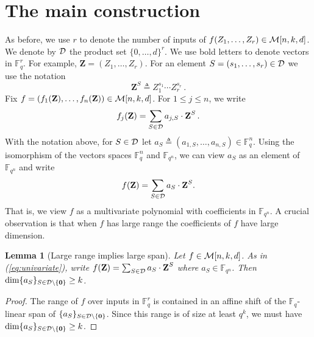\documentclass[10pt]{article}
\newtheorem{lemma}[theorem]{Lemma}
\theoremstyle{definition}
\numberwithin{equation}{section}
\newcommand{\F}{\mathbb F_q}
\newcommand{\Fn}{\mathbb F_{q^n}}
\newcommand{\M}[3]{{\cal M}[#1,#2,#3]}
\newcommand{\D}{{\cal D}}
\newcommand{\zero}{\{\textbf{0}\}}
\newcommand{\zi}{\textbf{Z}}
\begin{document}
 \section{The main construction}\label{sec:main}
As before, we use $r$ to denote the number of inputs of $f(Z_1,\ldots,Z_r)\in\M{n}{k}{d}$.
We denote by $\D$ the product set $\{0,\ldots,d\}^r$.
We use bold letters to denote vectors in $\F^r$.
For example, $\zi = (Z_1,\ldots,Z_r)$.
For an element $S=(s_1,\ldots,s_r)\in \D$ we use the notation
\[\zi^{S}\triangleq Z_1^{s_1}\cdots Z_r^{s_r}\,.\]
Fix $f=(f_1(\zi),\ldots,f_n(\zi))\in \M{n}{k}{d}$.
For $1\leq j\leq n$, we write
\[f_j(\zi) = \sum_{S \in \D} a_{j,S} \cdot \zi^S\,.\]
With the notation above, for $S\in \D$ let $a_S\triangleq
(a_{1,S},\ldots,a_{n,S})\in \F^n$. Using the isomorphism of the
vectors spaces $\F^n$ and $\Fn$, we can view $a_S$ as an element
of $\Fn$ and write
\begin{equation}
  \label{eq:univariate}
f(\zi) = \sum_{S \in \D} a_S \cdot \zi^S.
\end{equation}
That is, we view $f$ as a multivariate polynomial with coefficients in $\Fn$.
A crucial observation is that when $f$ has large range the coefficients
of $f$ have large dimension.
\begin{lemma}[Large range implies large span]\label{lem-spanofcoeff}
Let $f\in \M{n}{k}{d}$. As in (\ref{eq:univariate}), write $f(\zi)=\sum_{S\in \D} a_S\cdot
\zi^S$ where $a_S\in \Fn$. Then $\dim \{a_S\}_{ S\in \D\setminus \zero}\geq  k$.
\end{lemma}
\begin{proof}
The range of $f$ over inputs in $\F^r$ is contained in an affine
shift  of the $\F$-linear span of
$\{a_S\}_{S\in \D\setminus \zero}$. Since this range is of size at
least $q^k$, we must have $\dim \{a_S\}_{S\in \D\setminus
\zero}\geq  k$.
\end{proof}

%
%
%
%
%
\end{document}
